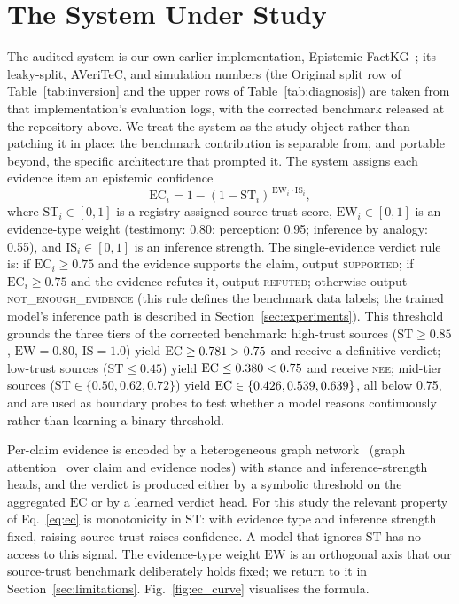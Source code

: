 \documentclass[conference]{IEEEtran}
\begin{document}
\section{The System Under Study}
\label{sec:system}
The audited system is our own earlier implementation, Epistemic FactKG~\cite{karki2026epistemicfactkg}; its leaky-split, AVeriTeC, and simulation numbers (the Original split row of Table~\ref{tab:inversion} and the upper rows of Table~\ref{tab:diagnosis}) are taken from that implementation's evaluation logs, with the corrected benchmark released at the repository above. We treat the system as the study object rather than patching it in place: the benchmark contribution is separable from, and portable beyond, the specific architecture that prompted it. The system assigns each evidence item an epistemic confidence
\begin{equation}
\mathrm{EC}_i = 1 - (1 - \mathrm{ST}_i)^{\,\mathrm{EW}_i \cdot \mathrm{IS}_i},
\label{eq:ec}
\end{equation}
where $\mathrm{ST}_i \in [0,1]$ is a registry-assigned source-trust score, $\mathrm{EW}_i \in [0,1]$ is an evidence-type weight (testimony: 0.80; perception: 0.95; inference by analogy: 0.55), and $\mathrm{IS}_i \in [0,1]$ is an inference strength. The single-evidence verdict rule is: if $\mathrm{EC}_i \geq 0.75$ and the evidence supports the claim, output \textsc{supported}; if $\mathrm{EC}_i \geq 0.75$ and the evidence refutes it, output \textsc{refuted}; otherwise output \textsc{not\_enough\_evidence} (this rule defines the benchmark data labels; the trained model's inference path is described in Section~\ref{sec:experiments}). This threshold grounds the three tiers of the corrected benchmark: high-trust sources ($\mathrm{ST}\geq 0.85$, $\mathrm{EW}=0.80$, $\mathrm{IS}=1.0$) yield $\mathrm{EC}\geq 0.781>0.75$ and receive a definitive verdict; low-trust sources ($\mathrm{ST}\leq 0.45$) yield $\mathrm{EC}\leq 0.380<0.75$ and receive \textsc{nee}; mid-tier sources ($\mathrm{ST}\in\{0.50,0.62,0.72\}$) yield $\mathrm{EC}\in\{0.426,0.539,0.639\}$, all below 0.75, and are used as boundary probes to test whether a model reasons continuously rather than learning a binary threshold.

Per-claim evidence is encoded by a heterogeneous graph network~\cite{schlichtkrull2018rgcn} (graph attention~\cite{velickovic2018gat} over claim and evidence nodes) with stance and inference-strength heads, and the verdict is produced either by a symbolic threshold on the aggregated $\mathrm{EC}$ or by a learned verdict head. For this study the relevant property of Eq.~\eqref{eq:ec} is monotonicity in $\mathrm{ST}$: with evidence type and inference strength fixed, raising source trust raises confidence. A model that ignores $\mathrm{ST}$ has no access to this signal. The evidence-type weight $\mathrm{EW}$ is an orthogonal axis that our source-trust benchmark deliberately holds fixed; we return to it in Section~\ref{sec:limitations}. Fig.~\ref{fig:ec_curve} visualises the formula.
\end{document}

